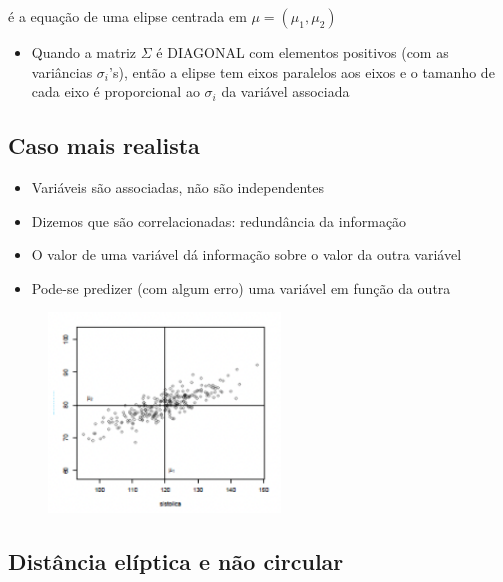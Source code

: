 \documentclass[
  letterpaper,
  DIV=11,
  numbers=noendperiod]{scrartcl}
\providecommand{\tightlist}{%
  \setlength{\itemsep}{0pt}\setlength{\parskip}{0pt}}\usepackage{longtable,booktabs,array}
\begin{document}
é a equação de uma elipse centrada em \(\mu = (\mu_1, \mu_2)\)

\begin{itemize}
\tightlist
\item
  Quando a matriz \(\Sigma\) é DIAGONAL com elementos positivos (com as
  variâncias \(\sigma_i\)'s), então a elipse tem eixos paralelos aos
  eixos e o tamanho de cada eixo é proporcional ao \(\sigma_i\) da
  variável associada
\end{itemize}

\hypertarget{caso-mais-realista}{%
\subsection{Caso mais realista}\label{caso-mais-realista}}

\begin{itemize}
\tightlist
\item
  Variáveis são associadas, não são independentes
\item
  Dizemos que são correlacionadas: redundância da informação
\item
  O valor de uma variável dá informação sobre o valor da outra variável
\item
  Pode-se predizer (com algum erro) uma variável em função da outra
\end{itemize}

\begin{figure}

{\centering \includegraphics[width=0.55\textwidth,height=\textheight]{figs/Aula07/caso_mais_realista.png}

}

\end{figure}

\hypertarget{distuxe2ncia-eluxedptica-e-nuxe3o-circular}{%
\subsection{Distância elíptica e não
circular}\label{distuxe2ncia-eluxedptica-e-nuxe3o-circular}}
\end{document}

